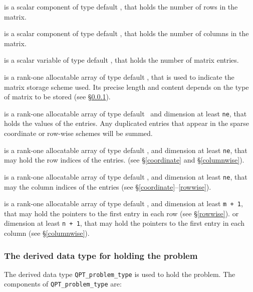 \documentclass{galahad}
\begin{document}
\begin{description}

 is a scalar component of type default \integer,
that holds the number of rows in the matrix.

 is a scalar component of type default \integer,
that holds the number of columns in the matrix.

 is a scalar variable of type default \integer, that
holds the number of matrix entries.

 is a rank-one allocatable array of type default \character, that
is used to indicate the matrix storage scheme used. Its precise length and
content depends on the type of matrix to be stored (see \S\ref{typeprob}).

 is a rank-one allocatable array of type default \realdp\,
and dimension at least {\tt ne}, that holds the values of the entries.
Any duplicated entries that appear in the sparse
coordinate or row-wise schemes will be summed.

 is a rank-one allocatable array of type default \integer,
and dimension at least {\tt ne}, that may hold the row indices of the entries.
(see \S\ref{coordinate} and \S\ref{columnwise}).

 is a rank-one allocatable array of type default \integer,
and dimension at least {\tt ne}, that may the column indices of the entries
(see \S\ref{coordinate}--\ref{rowwise}).

 is a rank-one allocatable array of type default \integer,
and dimension at least {\tt m + 1}, that may hold the pointers to
the first entry in each row (see \S\ref{rowwise}).
or dimension at least {\tt n + 1}, that may hold the pointers to
the first entry in each column (see \S\ref{columnwise}).

\end{description}


\subsubsection{The derived data type for holding the problem}\label{typeprob}
The derived data type {\tt QPT\_problem\_type} is used to hold
the problem. The components of
{\tt QPT\_problem\_type}
are:
\end{document}
